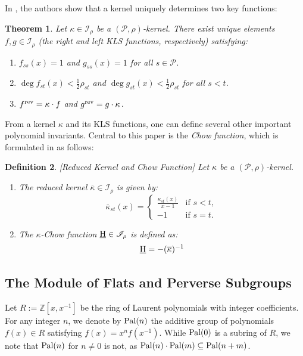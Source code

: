 \documentclass[11pt]{article}
\newcommand{\chow}{\normalfont\text{\underline{H}}}
\newcommand{\ZZ}{\mathbb{Z}}
\newcommand{\pal}{\normalfont\text{Pal}}
\newcommand{\mathscrI}{\mathscr{I}}
\newcommand{\calP}{\mathcal{P}}
\newcommand{\rev}{\normalfont\text{rev}}
\newtheorem{theorem}{Theorem}
\newtheorem{definition}[theorem]{Definition}
\theoremstyle{remark}
\begin{document}
In \cite{ferroni-matherne-vecchi}, the authors show that a kernel uniquely determines two key functions:
\begin{theorem}\label{thm:kernel-properties}
    Let \(\kappa \in \mathscrI_\rho\) be a \((\calP,\rho)\)-kernel. There exist unique elements
    \(f, g \in \mathscrI_\rho\) (the right and left KLS functions, respectively) satisfying:
    \begin{enumerate}[\normalfont(i)]
        \item \(f_{ss}(x) = 1\) and \(g_{ss}(x) = 1\) for all \(s \in \calP\).
        \item \(\deg f_{st}(x) < \frac{1}{2} \rho_{st}\) and \(\deg g_{st}(x) < \frac{1}{2}
              \rho_{st}\) for all \(s < t\).
        \item \(f^{\rev} = \kappa \cdot f\) and \(g^{\rev} = g \cdot \kappa\).
    \end{enumerate}
\end{theorem}

From a kernel \(\kappa\) and its KLS functions, one can define several other
important polynomial invariants.
Central to this paper is the \emph{Chow function},
which is formulated in \cite{ferroni-matherne-vecchi} as follows:

\begin{definition}\label{def:chow-reduced} [Reduced Kernel and Chow Function]
    Let \(\kappa\) be a \((\calP,\rho)\)-kernel.
    \begin{enumerate}
        \item The \emph{reduced kernel} \(\overline{\kappa} \in \mathscr{I}_\rho\) is given by:
              \[ \overline{\kappa}_{st}(x) = \begin{cases} \frac{\kappa_{st}(x)}{x - 1} & \text{if } s < t, \\ -1 & \text{if } s = t.\end{cases}\]
        \item The \emph{\(\kappa\)-Chow function} \(\chow \in \mathscr{I}_\rho\) is defined as:
              \[ \chow = - (\overline{\kappa})^{-1}\]
    \end{enumerate}
\end{definition}

\subsection{The Module of Flats and Perverse Subgroups}
Let \(R := \ZZ[x, x^{-1}]\) be the ring of Laurent polynomials with integer coefficients.
For any integer \(n\), we denote by \(\pal(n)\) the additive group of polynomials \(f(x) \in R\)
satisfying \(f(x) = x^n f(x^{-1})\). While \(\pal(0)\) is a subring of \(R\), we note that
\(\pal(n)\) for \(n \neq 0\) is not, as \(\pal(n) \cdot \pal(m) \subseteq \pal(n+m)\).
\end{document}
